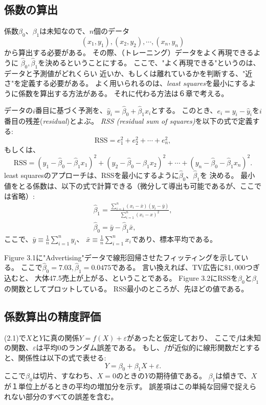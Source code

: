 \documentclass{jsbook}
\begin{document}
\subsection{係数の算出}
係数$\beta_0$、$\beta_1$は未知なので、$n$個のデータ
$$
(x_1, y_1), (x_2, y_2), \cdots, (x_n, y_n)
$$
から算出する必要がある。
その際、（トレーニング）データをよく再現できるように
$\hat{\beta}_0, \hat{\beta}_1$を決めるということにする。
ここで、"よく再現できる"というのは、データと予測値がどれくらい
近いか、もしくは離れているかを判断する、"近さ"を定義する必要がある。
よく用いられるのは、{\it{least squares}}を最小にするように係数を算出する方法がある。
それに代わる方法は６章で考える。

データの$i$番目に基づく予測を、$\hat{y}_i = \hat{\beta}_0 + \hat{\beta}_1 x_i$とする。
このとき、$e_i = y_i - \hat{y}_i$を$i$番目の残差({\it{residual}})とよぶ。
{\it{RSS (residual sum of squares)}}を以下の式で定義する:
$$
\text{RSS} = e_1^2 + e_2^2 + \cdots + e_n^2,
$$
もしくは、
\begin{equation}
\text{RSS} = (y_1 - \hat{\beta}_0 - \hat{\beta}_1 x_1)^2 + (y_2 - \hat{\beta}_0 - \hat{\beta}_1 x_2)^2
	+ \cdots + (y_n - \hat{\beta}_0 - \hat{\beta}_1 x_n)^2.
\end{equation}
least squaresのアプローチは、RSSを最小にするように$\hat{\beta}_0$、$\hat{\beta}_1$を
決める。
最小値をとる係数は、以下の式で計算できる（微分して導出も可能であるが、ここでは省略）:
\begin{equation}
\begin{gathered}
\hat{\beta}_1 = \frac{\sum_{i=1}^n (x_i - \bar{x}) (y_i - \bar{y})}{\sum_{i=1}^n (x_i - x)^2}, \\
\hat{\beta}_0 = \bar{y} - \hat{\beta}_1 \bar{x},
\end{gathered}
\end{equation}
ここで、$\bar{y} \equiv \frac{1}{n}\sum_{i=1}^n y_i$、
$\bar{x} \equiv \frac{1}{n} \sum_{i=1}^n x_i$であり、標本平均である。

Figure 3.1に"Advertising"データで線形回帰させたフィッティングを示している。
ここで$\hat{\beta}_0= 7.03, \hat{\beta}_1 = 0.0475$である。
言い換えれば、TV広告に$\$1,000$つぎ込むと、
大体47.5売上が上がる、ということである。
Figure 3.2にRSSを$\beta_0$と$\beta_1$の関数としてプロットしている。
RSS最小のところが、先ほどの値である。

\subsection{係数算出の精度評価}
(2.1)で$X$と$Y$に真の関係$Y = f(X) + \varepsilon$があったと仮定しており、
ここで$f$は未知の関数、$\varepsilon$は平均0のランダム誤差である。
もし、$f$が近似的に線形関数だとすると、関係性は以下の式で表せる:
\begin{equation}
	Y = \beta_0 + \beta_1 X + \varepsilon.
\end{equation}
ここで$\beta_0$は切片、すなわち、$X=0$のときの$Y$の期待値である。
$\beta_1$は傾きで、$X$が１単位上がるときの平均の増加分を示す。
誤差項はこの単純な回帰で捉えられない部分のすべての誤差を含む。
\end{document}
